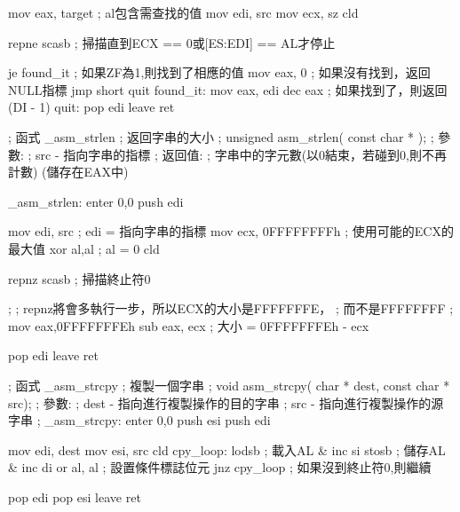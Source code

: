 \begin{AsmCodeListing}[label=memory.asm]
        mov     eax, target     ; al包含需查找的值
        mov     edi, src
        mov     ecx, sz
        cld

        repne   scasb           ; 掃描直到ECX == 0或[ES:EDI] == AL才停止

        je      found_it        ; 如果ZF為1,則找到了相應的值
        mov     eax, 0          ; 如果沒有找到，返回NULL指標
        jmp     short quit
found_it:
        mov     eax, edi
        dec     eax              ; 如果找到了，則返回(DI - 1)
quit:
        pop     edi
        leave
        ret


; 函式 _asm_strlen
; 返回字串的大小
; unsigned asm_strlen( const char * );
; 參數:
;   src - 指向字串的指標
; 返回值:
;   字串中的字元數(以0結束，若碰到0,則不再計數) (儲存在EAX中)

_asm_strlen:
        enter   0,0
        push    edi

        mov     edi, src        ; edi = 指向字串的指標
        mov     ecx, 0FFFFFFFFh ; 使用可能的ECX的最大值
        xor     al,al           ; al = 0
        cld

        repnz   scasb           ; 掃描終止符0

;
; repnz將會多執行一步，所以ECX的大小是FFFFFFFE，
; 而不是FFFFFFFF
;
        mov     eax,0FFFFFFFEh
        sub     eax, ecx        ; 大小 = 0FFFFFFFEh - ecx

        pop     edi
        leave
        ret

; 函式 _asm_strcpy
; 複製一個字串
; void asm_strcpy( char * dest, const char * src);
; 參數:
;   dest - 指向進行複製操作的目的字串
;   src  - 指向進行複製操作的源字串
;
_asm_strcpy:
        enter   0,0
        push    esi
        push    edi

        mov     edi, dest
        mov     esi, src
        cld
cpy_loop:
        lodsb                   ; 載入AL & inc si
        stosb                   ; 儲存AL & inc di
        or      al, al          ; 設置條件標誌位元
        jnz     cpy_loop        ; 如果沒到終止符0,則繼續

        pop     edi
        pop     esi
        leave
        ret
\end{AsmCodeListing}

